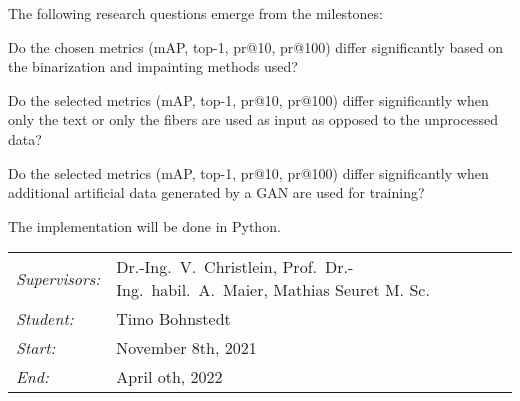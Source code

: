 \documentclass[12pt,a4paper]{article}
\begin{document}
The following research questions emerge from the milestones:

\begin{questions}
	\item Do the chosen metrics (mAP, top-1, pr@10, pr@100) differ significantly based on the binarization and impainting methods used?
	
	\item  Do the selected metrics (mAP, top-1, pr@10, pr@100) differ significantly when only the text or only the fibers are used as input as opposed to the unprocessed data?  
	
	\item  Do the selected metrics (mAP, top-1, pr@10, pr@100) differ significantly when additional artificial data generated by a GAN are used for training?
\end{questions}

		
The implementation will be done in Python.\\
		
\begin{tabular}{ll}
	\emph{Supervisors:} & Dr.-Ing.~V.~Christlein,  Prof.~Dr.-Ing.~habil.~A.~Maier, Mathias Seuret M. Sc.
	\\
	\emph{Student:}     & Timo Bohnstedt
	\\
	\emph{Start:}       & November 8th, 2021                                            \\
	\emph{End:}         & April oth, 2022                                        \\
\end{tabular}
\nopagebreak[4]
\small

		
\end{document}
